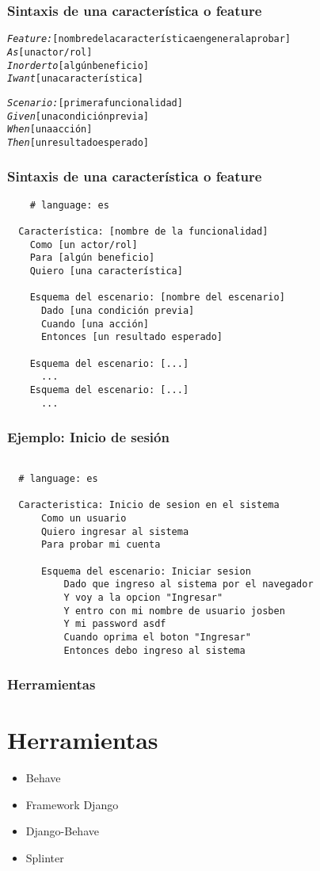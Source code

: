 \documentclass{beamer}
\begin{document}
\begin{frame}[fragile]
  \frametitle{Sintaxis de una característica o feature}
  \begin{alltt}
\emph{Feature:} [nombre de la característica en general a probar]
  \emph{As} [un actor/rol]
  \emph{In order to} [algún beneficio]
  \emph{I want} [una característica]

  \emph{Scenario:} [primera funcionalidad]
    \emph{Given} [una condición previa]
    \emph{When} [una acción]
    \emph{Then} [un resultado esperado]
\end{alltt}
\end{frame}

\begin{frame}[fragile]
  \frametitle{Sintaxis de una característica o feature}
  \begin{verbatim}
    # language: es

  Característica: [nombre de la funcionalidad]
    Como [un actor/rol]
    Para [algún beneficio]
    Quiero [una característica]

    Esquema del escenario: [nombre del escenario]
      Dado [una condición previa]
      Cuando [una acción]
      Entonces [un resultado esperado]

    Esquema del escenario: [...]
      ...
    Esquema del escenario: [...]
      ...
  \end{verbatim}
\end{frame}

\begin{frame}[fragile]
  \frametitle{Ejemplo: Inicio de sesión}
  \begin{verbatim}

  # language: es

  Caracteristica: Inicio de sesion en el sistema
      Como un usuario
      Quiero ingresar al sistema
      Para probar mi cuenta

      Esquema del escenario: Iniciar sesion
          Dado que ingreso al sistema por el navegador
          Y voy a la opcion "Ingresar"
          Y entro con mi nombre de usuario josben
          Y mi password asdf
          Cuando oprima el boton "Ingresar"
          Entonces debo ingreso al sistema
  \end{verbatim}
\end{frame}

\begin{frame}
  \frametitle{Herramientas}
  \section{Herramientas}
  \begin{itemize}
      \item Behave
      \item Framework Django
      \item Django-Behave
      \item Splinter
  \end{itemize}
\end{frame}
\end{document}
